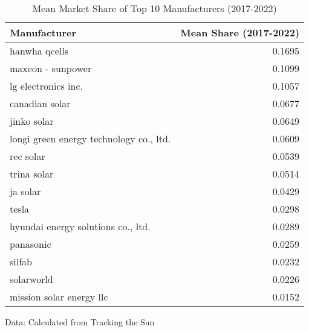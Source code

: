 \begin{table}[!t]
\caption*{
{\large Mean Market Share of Top 10 Manufacturers (2017-2022)}
} 
\fontsize{12.0pt}{14.4pt}\selectfont
\begin{tabular*}{\linewidth}{@{\extracolsep{\fill}}lr}
\toprule
Manufacturer & Mean Share (2017-2022) \\ 
\midrule\addlinespace[2.5pt]
hanwha qcells & 0.1695 \\ 
maxeon - sunpower & 0.1099 \\ 
lg electronics inc. & 0.1057 \\ 
canadian solar & 0.0677 \\ 
jinko solar & 0.0649 \\ 
longi green energy technology co., ltd. & 0.0609 \\ 
rec solar & 0.0539 \\ 
trina solar & 0.0514 \\ 
ja solar & 0.0429 \\ 
tesla & 0.0298 \\ 
hyundai energy solutions co., ltd. & 0.0289 \\ 
panasonic & 0.0259 \\ 
silfab & 0.0232 \\ 
solarworld & 0.0226 \\ 
mission solar energy llc & 0.0152 \\ 
\bottomrule
\end{tabular*}
\begin{minipage}{\linewidth}
Data: Calculated from Tracking the Sun\\
\end{minipage}
\end{table}
